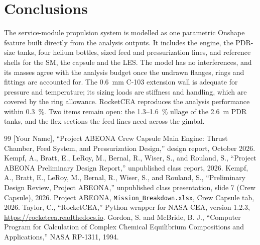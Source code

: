 \documentclass[10pt]{article}
\begin{document}
\section{Conclusions}
The service-module propulsion system is modelled as one parametric Onshape feature built directly from the analysis
outputs. It includes the engine, the PDR-size tanks, four helium bottles, sized feed and pressurization lines, and
reference shells for the SM, the capsule and the LES. The model has no interferences, and its masses agree with the
analysis budget once the undrawn flanges, rings and fittings are accounted for. The 0.6~mm C-103 extension wall is
adequate for pressure and temperature; its sizing loads are stiffness and handling, which are covered by the ring
allowance. RocketCEA reproduces the analysis performance within 0.3~\%. Two items remain open: the 1.3--1.6~\% ullage of
the 2.6~m PDR tanks, and the flex sections the feed lines need across the gimbal.

\begin{thebibliography}{99}\small
{} [Your Name], ``Project ABEONA Crew Capsule Main Engine: Thrust Chamber, Feed System, and Pressurization Design,'' design report, October 2026.
 Kempf, A., Bratt, E., LeRoy, M., Bernal, R., Wiser, S., and Rouland, S., ``Project ABEONA Preliminary Design Report,'' unpublished class report, 2026.
 Kempf, A., Bratt, E., LeRoy, M., Bernal, R., Wiser, S., and Rouland, S., ``Preliminary Design Review, Project ABEONA,'' unpublished class presentation, slide 7 (Crew Capsule), 2026.
 Project ABEONA, \texttt{Mission\_Breakdown.xlsx}, Crew Capsule tab, 2026.
 Taylor, C., ``RocketCEA,'' Python wrapper for NASA CEA, version 1.2.3, \url{https://rocketcea.readthedocs.io}.
 Gordon, S. and McBride, B. J., ``Computer Program for Calculation of Complex Chemical Equilibrium Compositions and Applications,'' NASA RP-1311, 1994.
\end{thebibliography}
\end{document}
